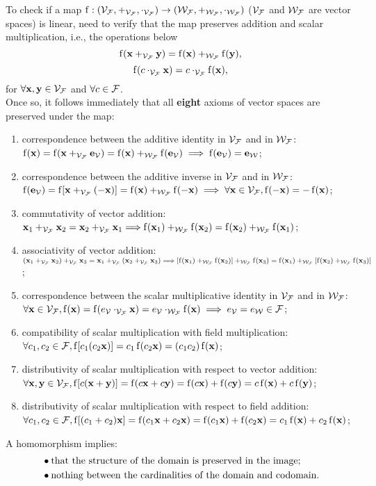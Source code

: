 \begin{remark}
To check if a map $\f: (\VF, +_{\VF}, \cdot_{\VF}) \to (\WF, +_{\WF}, \cdot_{\WF})$ ($\VF$ and $\WF$ are vector spaces) is linear, need to verify that the map preserves addition and scalar multiplication, i.e., the operations below
$$\f( \x +_{\VF} \y ) = \f(\x) +_{\WF} \f(\y),$$
$$\f(c \cdot_{\VF} \x) = c \cdot_{\VF} \f(\x),$$
for $\forall \x, \y \in \VF$ and $\forall c \in \F$. \\
Once so, it follows immediately that all \textbf{eight} axioms of vector spaces are preserved under the map:
\begin{enumerate}
    \item correspondence between the additive identity in $\VF$ and in $\WF$: $\f(\x) = \f(\x +_{\VF} \e_{\V}) = \f(\x) +_{\WF} \f(\e_{\V}) \implies \f(\e_{\V}) = \e_\W$;
    \item correspondence between the additive inverse in $\VF$ and in $\WF$: $\f(\e_{\V}) = \f[\x +_{\VF} (-\x)] = \f(\x) +_{\WF} \f(-\x) \implies \forall \x \in \VF, \f(-\x) = - \f(\x)$;
    \item commutativity of vector addition:  $\x_1 +_{\VF} \x_2 = \x_2 +_{\VF} \x_1 \Longrightarrow \f(\x_1) +_{\WF} \f(\x_2) = \f(\x_2) +_{\WF} \f(\x_1)$;
    \item associativity of vector addition: $ (\x_1 +_{\VF} \x_2) +_{\VF} \x_3 =  \x_1 +_{\VF} (\x_2 +_{\VF} \x_3) \Longrightarrow [\f(\x_1) +_{\WF} \f(\x_2)] +_{\WF} \f(\x_3) = \f(\x_1) +_{\WF} [\f(\x_2) +_{\WF} \f(\x_3)]$;
    \item correspondence between the scalar multiplicative identity in $\VF$ and in $\WF$: $\forall \x \in \VF, \f(\x) = \f(e_\V \cdot_{\VF}  \x) = e_\V \cdot_{\WF} \f(\x) \implies e_\V = e_\W \in \F$;
    \item compatibility of scalar multiplication with field multiplication: $\forall c_1,c_2 \in \F, \f[c_1 (c_2\x)] = c_1 \f(c_2\x) = (c_1 c_2) \f(\x)$;
    \item distributivity of scalar multiplication with respect to vector addition: $\forall \x,\y \in \VF, \f[c (\x + \y)] = \f(c\x + c\y) = \f(c\x) + \f(c\y) = c\f(\x) + c\f(\y)$;
    \item distributivity of scalar multiplication with respect to field addition: $\forall c_1,c_2 \in \F, \f[(c_1+c_2) \x] = \f(c_1\x + c_2\x) = \f(c_1\x) + \f(c_2\x) = c_1\f(\x) + c_2\f(\x)$;

\end{enumerate}
%
\end{remark}
%
\begin{remark}
A homomorphism implies:
\begin{align*}
    &\bullet \textnormal{that the structure of the domain is preserved in the image;}\\
    &\bullet \textnormal{nothing between the cardinalities of the domain and codomain}.
\end{align*}
\end{remark}
%

